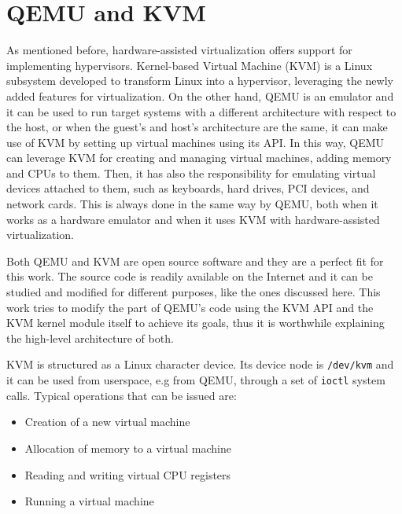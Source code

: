 \section{QEMU and KVM}
As mentioned before, hardware-assisted virtualization offers support for implementing hypervisors. Kernel-based Virtual Machine (KVM) \cite{kvm} is a Linux subsystem developed to transform Linux into a hypervisor, leveraging the newly added features for virtualization. On the other hand, QEMU is an emulator and it can be used to run target systems with a different architecture with respect to the host, or when the guest's and host's architecture are the same, it can make use of KVM by setting up virtual machines using its API. In this way, QEMU can leverage KVM for creating and managing virtual machines, adding memory and CPUs to them. Then, it has also the responsibility for emulating virtual devices attached to them, such as keyboards, hard drives, PCI devices, and network cards. This is always done in the same way by QEMU, both when it works as a hardware emulator and when it uses KVM with hardware-assisted virtualization.
\par 
Both QEMU and KVM are open source software and they are a perfect fit for this work. The source code is readily available on the Internet and it can be studied and modified for different purposes, like the ones discussed here. This work tries to modify the part of QEMU's code using the KVM API and the KVM kernel module itself to achieve its goals, thus it is worthwhile explaining the high-level architecture of both. 
\par 
KVM is structured as a Linux character device. Its device node is \texttt{/dev/kvm} and it can be used from userspace, e.g from QEMU, through a set of \texttt{ioctl} system calls. Typical operations that can be issued are:
\begin{itemize}
    \item Creation of a new virtual machine
    \item Allocation of memory to a virtual machine 
    \item Reading and writing virtual CPU registers
    \item Running a virtual machine
\end{itemize}
